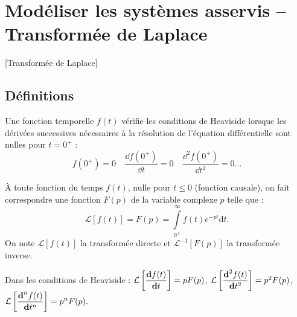 
\section{Modéliser les systèmes asservis -- Transformée de Laplace}[Transformée de Laplace]
\subsection{Définitions}

\begin{defi}  

Une fonction temporelle $f(t)$ vérifie les conditions de Heaviside lorsque les dérivées successives nécessaires à la résolution de l'équation différentielle sont nulles pour $t={0^{+}}$ :
$$
f({0^{+}})=0 \quad \dfrac{\dd f({0^{+}})}{\dd t} = 0 \quad \dfrac{\dd^2f({0^{+}})}{\dd t^2} = 0 ...
$$
\end{defi}

\begin{defi} 
À toute fonction du temps $f(t)$, nulle pour $t\leq0$ (fonction causale), on fait correspondre une fonction $F(p)$ de la variable complexe $p$ telle que :
$$
\mathcal{L}\left[f(t)\right] = F(p)=\int\limits_{0^{+}}^\infty f(t)e^{-pt}\text{d}t.
$$
On note $\mathcal{L}\left[f(t)\right]$ la transformée directe et $\mathcal{L}^{-1}\left[F(p)\right]$ la transformée inverse.
\end{defi}




\begin{resultat} [Dérivation]

Dans les conditions de Heaviside :
$\mathcal{L}\left[ \dfrac{\text{\textbf{d}} f(t)}{\text{\textbf{d}} t}\right] =pF(p)$,
$\mathcal{L}\left[ \dfrac{\text{\textbf{d}}^2f(t)}{\text{\textbf{d}} t^2}\right] =p^2F(p) $,
$\mathcal{L}\left[ \dfrac{\text{\textbf{d}}^nf(t)}{\text{\textbf{d}} t^n}\right] =p^nF(p).$

\end{resultat}



